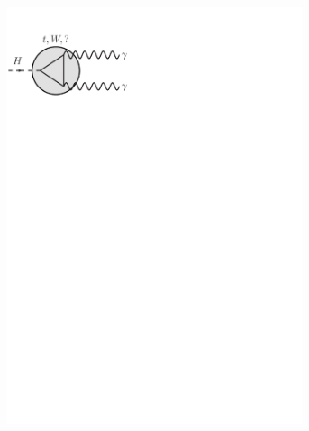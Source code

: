 \begin{figure}[htb!]
\begin{subfigure}{0.32\textwidth}
  \includegraphics[trim=0cm 22cm 12cm 0.5cm, clip=true, width=0.95\textwidth]{Analysis/Figures_ttH/Hgaga.pdf}
  \caption{}\label{fig:eff_vtx_Hgaga}\end{subfigure}
  \begin{subfigure}{0.32\textwidth}

\end{subfigure}
\end{figure}
